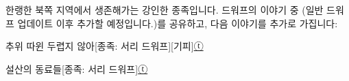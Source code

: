 \documentclass{report}
\begin{document}
	한랭한 북쪽 지역에서 생존해가는 강인한 종족입니다. 드워프의 이야기 중 (일반 드워프 업데이트 이후 추가할 예정입니다.)를 공유하고, 다음 이야기를 추가로 가집니다:
	
	\begin{story}{추위 따윈 두렵지 않아}{[종족: 서리 드워프][기피]\hyperlink{celesteela}{ⓣ}}
		
		
	\end{story}
	
	\begin{story}{설산의 동료들}{[종족: 서리 드워프]\hyperlink{celesteela}{ⓣ}}
		
	\end{story}
\end{document}

